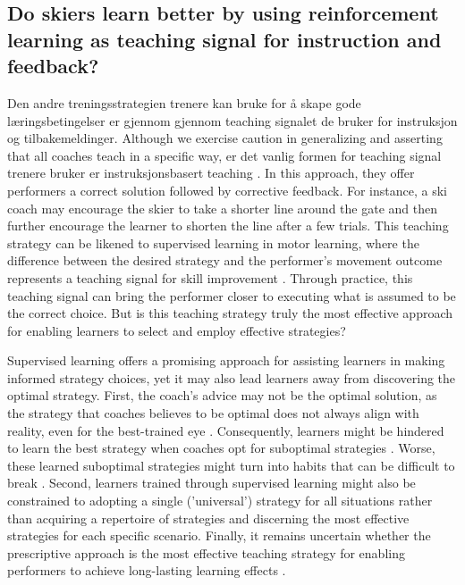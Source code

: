 \subsection{Do skiers learn better by using reinforcement learning as teaching signal for instruction and feedback?}
Den andre treningsstrategien trenere kan bruke for å skape gode læringsbetingelser er gjennom gjennom teaching signalet de bruker for instruksjon og tilbakemeldinger. Although we exercise caution in generalizing and asserting that all coaches teach in a specific way, er det vanlig formen for teaching signal trenere bruker er instruksjonsbasert teaching \cite{williams_practice_2005, williams_effective_2023, hodges_modelling_2002}. In this approach, they offer performers a correct solution followed by corrective feedback. For instance, a ski coach may encourage the skier to take a shorter line around the gate and then further encourage the learner to shorten the line after a few trials. This teaching strategy can be likened to supervised learning in motor learning, where the difference between the desired strategy and the performer's movement outcome represents a teaching signal for skill improvement  \cite{jordan_forward_1992, wolpert_motor_2010, doya_complementary_2000}. Through practice, this teaching signal can bring the performer closer to executing what is assumed to be the correct choice. But is this teaching strategy truly the most effective approach for enabling learners to select and employ effective strategies? 

Supervised learning offers a promising approach for assisting learners in making informed strategy choices, yet it may also lead learners away from discovering the optimal strategy. First, the coach's advice may not be the optimal solution, as the strategy that coaches believes to be optimal does not always align with reality, even for the best-trained eye \cite{supej_impact_2019, cochrum_visual_2021}. Consequently, learners might be hindered to learn the best strategy when coaches opt for suboptimal strategies \cite{gray_plateaus_2017}. Worse, these learned suboptimal strategies might turn into habits that can be difficult to break \cite{popp_effect_2020}. Second, learners trained through supervised learning might also be constrained to adopting a single ('universal') strategy for all situations rather than acquiring a repertoire of strategies and discerning the most effective strategies for each specific scenario. Finally, it remains uncertain whether the prescriptive approach is the most effective teaching strategy for enabling performers to achieve long-lasting learning effects \cite{wulf_instructions_1997, hodges_role_1999, williams_practice_2005,williams_effective_2023}. 

